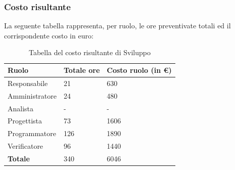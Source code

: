 






\subsubsection{Costo risultante}
La seguente tabella rappresenta, per ruolo, le ore preventivate totali ed il corrispondente costo in euro:
{
\renewcommand{\arraystretch}{2}
\begin{longtable}{ C{3cm} C{2cm} C{4cm}}
\caption{Tabella del costo risultante di Sviluppo}\\
\rowcolor{\primaryColor}

\textcolor{\secondaryColor}{\textbf{Ruolo}} & 
\textcolor{\secondaryColor}{\textbf{Totale ore}} & 
\textcolor{\secondaryColor}{\textbf{Costo ruolo (in \euro{})}}\\	
\endhead
        
Responsabile    & 21 & 630 \\
Amministratore  & 24 & 480 \\
Analista        & - & - \\
Progettista     & 73 & 1606 \\
Programmatore   & 126 & 1890 \\
Verificatore    & 96 & 1440 \\
\textbf{Totale} & 340 & 6046 \\
		
\end{longtable}
}


